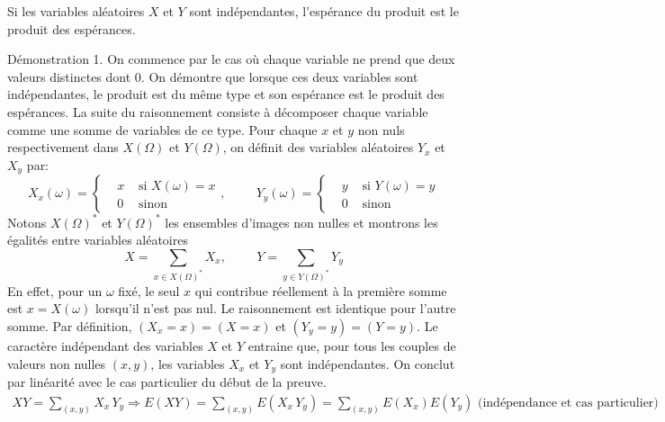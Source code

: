 \begin{prop}
 Si les variables aléatoires $X$ et $Y$ sont indépendantes, l'espérance du produit est le produit des espérances.
\end{prop}
\begin{demo}
Démonstration 1.\newline
 On commence par le cas où chaque variable ne prend que deux valeurs distinctes dont $0$. On démontre que lorsque ces deux variables sont indépendantes, le produit est du même type et son espérance est le produit des espérances.\newline
La suite du raisonnement consiste à décomposer chaque variable comme une somme de variables de ce type.\newline
Pour chaque $x$ et $y$ non nuls respectivement dans $X(\Omega)$ et $Y(\Omega)$, on définit des variables aléatoires $Y_x$ et $X_y$ par:
\begin{displaymath}
 X_x(\omega)=
\left\lbrace 
\begin{aligned}
 &x &\text{ si }X(\omega)=x \\ &0 &\text{ sinon}
\end{aligned}
\right.
,\hspace{1cm}
Y_y(\omega)=
\left\lbrace 
\begin{aligned}
 &y &\text{ si }Y(\omega)=y \\ &0 &\text{ sinon}
\end{aligned}
\right. 
\end{displaymath}
Notons $X(\Omega)^*$ et $Y(\Omega)^*$ les ensembles d'images non nulles et montrons les égalités entre variables aléatoires
\begin{displaymath}
 X = \sum_{x\in X(\Omega)^*}X_x ,\hspace{1cm} Y = \sum_{y\in Y(\Omega)^*}Y_y 
\end{displaymath}
En effet, pour un $\omega$ fixé, le seul $x$ qui contribue réellement à la première somme est $x=X(\omega)$ lorsqu'il n'est pas nul. Le raisonnement est identique pour l'autre somme.\newline
Par définition, $(X_x=x) = (X=x)$ et $(Y_y=y) = (Y=y)$. Le caractère indépendant des variables $X$ et $Y$ entraine que, pour tous les couples de valeurs non nulles $(x,y)$, les variables $X_x$ et $Y_y$ sont indépendantes. On conclut par linéarité avec le cas particulier du début de la preuve.
\begin{multline*}
 XY = \sum_{(x,y)}X_x\,Y_y \Rightarrow
E(XY) = \sum_{(x,y)}E(X_x\,Y_y)
= \sum_{(x,y)}E(X_x) E(Y_y)\text{ (indépendance et cas particulier)}\\

\end{multline*}
\end{demo}
